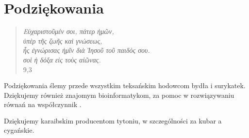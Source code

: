 \chapter{Podziękowania}

\begin{quote}
    \textit{
    \textgreek{Εὐχαριστοῦμέν σοι, πάτερ ἡμῶν,\\
    ὑπὲρ τῆς ζωῆς καὶ γνώσεως,\\
    ἧς ἐγνώρισας ἡμῖν διὰ Ἰησοῦ τοῦ παιδός σου.\\
    σοὶ ἡ δόξα εἰς τοὺς αἰῶνας.}} \\ 9,3
    
\end{quote}

Podziękowania ślemy przede wszystkim teksańskim hodowcom bydła i surykatek. Dziękujemy również znajomym bioinformatykom, za pomoc w rozwiązywaniu równań na współczynnik \Wn. 

Dziękujemy karaibskim producentom tytoniu, w szczególności za kubar
a cygańskie.